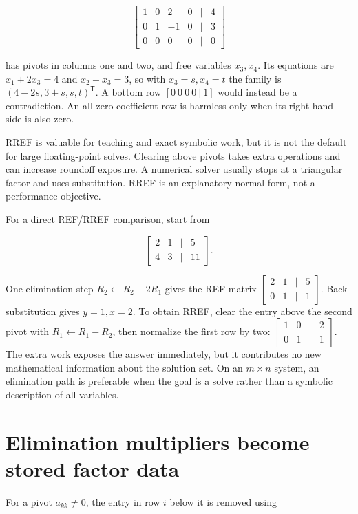 \[
\begin{bmatrix}1&0&2&0&|&4\\0&1&-1&0&|&3\\0&0&0&0&|&0\end{bmatrix}
\]

has pivots in columns one and two, and free variables \(x_3,x_4\). Its equations are \(x_1+2x_3=4\) and \(x_2-x_3=3\), so with \(x_3=s,x_4=t\) the family is \((4-2s,3+s,s,t)^\mathsf T\). A bottom row \([0\ 0\ 0\ 0\ |\ 1]\) would instead be a contradiction. An all-zero coefficient row is harmless only when its right-hand side is also zero.

RREF is valuable for teaching and exact symbolic work, but it is not the default for large floating-point solves. Clearing above pivots takes extra operations and can increase roundoff exposure. A numerical solver usually stops at a triangular factor and uses substitution. RREF is an explanatory normal form, not a performance objective.

For a direct REF/RREF comparison, start from

\[
\begin{bmatrix}2&1&|&5\\4&3&|&11\end{bmatrix}.
\]

One elimination step \(R_2\leftarrow R_2-2R_1\) gives the REF matrix \(\begin{bmatrix}2&1&|&5\\0&1&|&1\end{bmatrix}\). Back substitution gives \(y=1,x=2\). To obtain RREF, clear the entry above the second pivot with \(R_1\leftarrow R_1-R_2\), then normalize the first row by two: \(\begin{bmatrix}1&0&|&2\\0&1&|&1\end{bmatrix}\). The extra work exposes the answer immediately, but it contributes no new mathematical information about the solution set. On an \(m\times n\) system, an elimination path is preferable when the goal is a solve rather than a symbolic description of all variables.

\section{Elimination multipliers become stored factor data}\label{01-foundations-i-ch019-elimination-multipliers-become-stored-factor-data}

For a pivot \(a_{kk}\ne0\), the entry in row \(i\) below it is removed using

